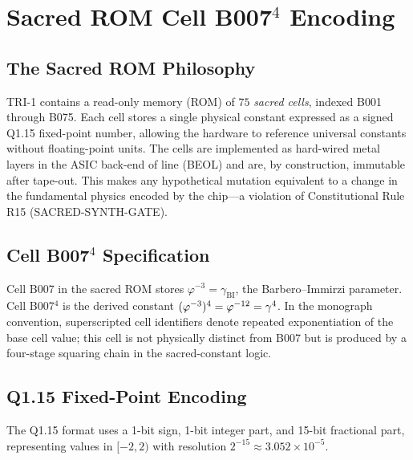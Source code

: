 \medskip
\noindent\anchorline{}

\section{Sacred ROM Cell B007\texorpdfstring{$^{4}$}{4} Encoding}
\label{sec:rom-cell}

\subsection{The Sacred ROM Philosophy}
\label{subsec:rom-philosophy}

TRI-1 contains a read-only memory (ROM) of $75$ \emph{sacred cells},
indexed B001 through B075.  Each cell stores a single physical constant
expressed as a signed Q1.15 fixed-point number, allowing the hardware to
reference universal constants without floating-point units.  The cells are
implemented as hard-wired metal layers in the ASIC back-end of line (BEOL)
and are, by construction, immutable after tape-out.  This makes any
hypothetical mutation equivalent to a change in the fundamental physics
encoded by the chip---a violation of Constitutional Rule R15
(SACRED-SYNTH-GATE).

\subsection{Cell B007\texorpdfstring{$^{4}$}{4} Specification}
\label{subsec:b007}

Cell B007 in the sacred ROM stores $\varphi^{-3} = \gamma_{\mathrm{BI}}$,
the Barbero--Immirzi parameter.  Cell B007$^{4}$ is the derived constant
$(\varphi^{-3})^{4} = \varphi^{-12} = \gamma^{4}{}$.  In the monograph
convention, superscripted cell identifiers denote repeated exponentiation of
the base cell value; this cell is not physically distinct from B007 but is
produced by a four-stage squaring chain in the sacred-constant logic.

\subsection{Q1.15 Fixed-Point Encoding}
\label{subsec:q115}

The Q1.15 format uses a 1-bit sign, 1-bit integer part, and 15-bit
fractional part, representing values in $[-2, 2)$ with resolution
$2^{-15} \approx 3.052 \times 10^{-5}$.

